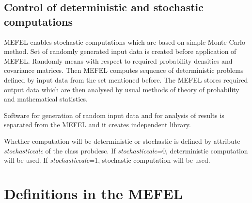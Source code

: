 
\subsection{Control of deterministic and stochastic computations}
\label{sectdetstochcontr}

MEFEL enables stochastic computations which are based on simple Monte Carlo method.
Set of randomly generated input data is created before application of MEFEL. Randomly
means with respect to required probability densities and covariance matrices.
Then MEFEL computes sequence of deterministic problems defined by input data from
the set mentioned before. The MEFEL stores required output data which are then
analysed by usual methods of theory of probability and mathematical statistics.

Software for generation of random input data and for analysis of results is separated
from the MEFEL and it creates independent library.

Whether computation will be deterministic or stochastic is defined by attribute
{\it stochasticcalc} of the class {\sf probdesc}.
If {\it stochasticcalc}=0, deterministic
computation will be used.  If {\it stochasticcalc}=1, stochastic computation will be used.

\section{Definitions in the MEFEL}

